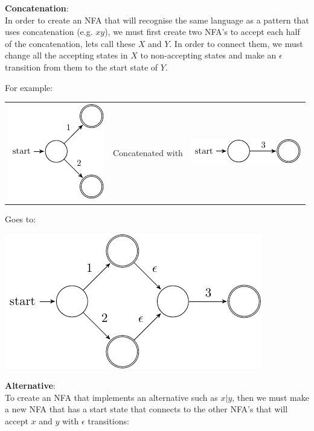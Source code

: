\begin{description}
  \item {\bf Concatenation}:\\
    In order to create an NFA that will recognise the same language as a
    pattern that uses concatenation (e.g. $xy$), we must first create two
    NFA's to accept each half of the concatenation, lets call these $X$ and
    $Y$. In order to connect them, we must change all the accepting states
    in $X$ to non-accepting states and make an $\epsilon$ transition from
    them to the start state of $Y$.

    For example:

    \begin{tabular}{lcr}
      \includegraphics{automata/15.pdf}
      &
      Concatenated with
      &
      \includegraphics{automata/16.pdf}
    \end{tabular}

    Goes to:

    \begin{center}
      \includegraphics{automata/17.pdf}
    \end{center}
  \item {\bf Alternative}:\\
    To create an NFA that implements an alternative such as $x|y$, then we
    must make a new NFA that has a start state that connects to the other
    NFA's that will accept $x$ and $y$ with $\epsilon$ transitions:


\end{description}
